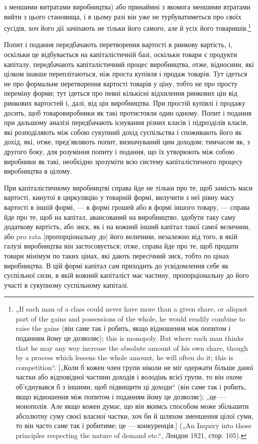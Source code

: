 \parcont{}  %
з меншими витратами виробництва) або принаймні з якомога меншими
втратами вийти з цього становища, і в цьому разі він уже не
турбуватиметься про своїх сусідів, хоч його дії зачіпають не тільки
його самого, але й усіх його товаришів.\footnote{
„If each man of a class could never have more than a given share, or
aliquot part of the gains and possessions of the whole, he would readily combine
to raise the gains (він саме так і робить, якщо відношення між попитом і поданням
йому це дозволяє); this is monopoly. But where each man thinks that he
may any way increase the absolute amount of his own share, though by a process
which lessens the whole amount, he will often do it; this is competition“. [„Коли б
кожен член групи ніколи не міг одержати більше даної частки або відповідної
частини доходів і володінь всієї групи, то він охоче об’єднувався б з іншими,
щоб підвищити ці доходи“ (він саме так і робить, якщо відношення між попитом
і поданням йому це дозволяє); „це — монополія. Але якщо кожен думає,
що він якимсь способом може збільшити абсолютну суму своєї власної частки,
хоч би й шляхом зменшення цілої суми, то він часто саме так і робитиме; це —
конкуренція.] („An Inquiry into those principles respecting the nature of demand
etc.“, Лондон 1821, стор. 105).
}

Попит і подання передбачають перетворення вартості в ринкову
вартість, і, оскільки це відбувається на капіталістичній
базі, оскільки товари є продукти капіталу, передбачають капіталістичний
процес виробництва, отже, відносини, які цілком інакше
переплітаються, ніж проста купівля і продаж товарів. Тут ідеться
не про формальне перетворення вартості товарів у ціну, тобто
не про просту переміну форми; тут ідеться про певні кількісні
відхилення ринкових цін від ринкових вартостей і, далі, від цін виробництва.
При простій купівлі і продажу досить, щоб товаровиробники
як такі протистояли один одному. Попит і подання при
дальшому аналізі передбачають існування різних класів і підрозділів
класів, які розподіляють між собою сукупний дохід суспільства
і споживають його як дохід, які, отже, пред’являють попит, визначуваний
цим доходом; тимчасом як, з другого боку, для розуміння
попиту і подання, що їх утворюють між собою виробники
як такі, необхідно зрозуміти всю систему капіталістичного
процесу виробництва в цілому.

При капіталістичному виробництві справа йде не тільки про те,
щоб замість маси вартості, кинутої в циркуляцію у товарній
формі, вилучити з неї рівну масу вартості в іншій формі, —
в формі грошей або в формі іншого товару, — справа йде про те,
щоб на капітал, авансований на виробництво, здобути таку саму
додаткову вартість, або зиск, як і на кожний інший капітал такої
самої величини, або pro rata [пропорціональну до] його величини,
незалежно від того, в якій галузі виробництва він застосовується;
отже, справа йде про те, щоб продати товари мінімум
по таких цінах, які дають пересічний зиск, тобто по цінах виробництва.
В цій формі капітал сам приходить до усвідомлення
себе як суспільної сили, в якій кожний капіталіст має частину,
пропорціональну до його участі в сукупному суспільному капіталі.

